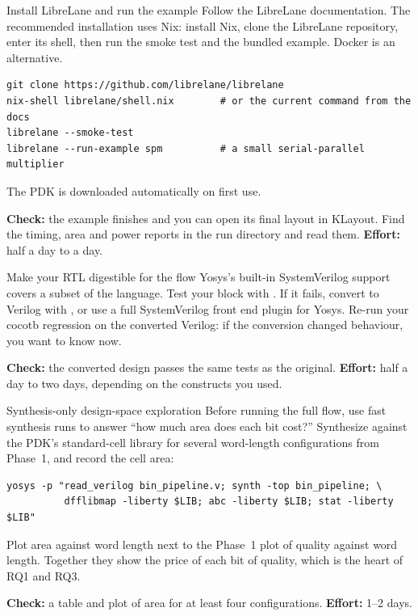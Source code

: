 \begin{stepbox}[label=st:asic:install]{Install LibreLane and run the example}
Follow the LibreLane documentation. The recommended installation uses Nix:
install Nix, clone the LibreLane repository, enter its shell, then run the
smoke test and the bundled example. Docker is an alternative.
\begin{lstlisting}[style=shell]
git clone https://github.com/librelane/librelane
nix-shell librelane/shell.nix        # or the current command from the docs
librelane --smoke-test
librelane --run-example spm          # a small serial-parallel multiplier
\end{lstlisting}
The PDK is downloaded automatically on first use.

\textbf{Check:} the example finishes and you can open its final layout in
KLayout. Find the timing, area and power reports in the run directory and read
them. \textbf{Effort:} half a day to a day.
\end{stepbox}

\begin{stepbox}[label=st:asic:sv]{Make your RTL digestible for the flow}
Yosys's built-in SystemVerilog support covers a subset of the language. Test your
block with . If it
fails, convert to Verilog with , or use a full SystemVerilog front end
plugin for Yosys. Re-run your cocotb regression on the converted Verilog: if
the conversion changed behaviour, you want to know now.

\textbf{Check:} the converted design passes the same tests as the original.
\textbf{Effort:} half a day to two days, depending on the constructs you used.
\end{stepbox}

\begin{stepbox}[label=st:asic:sweep]{Synthesis-only design-space exploration}
Before running the full flow, use fast synthesis runs to answer \enquote{how
much area does each bit cost?} Synthesize  against the
PDK's standard-cell library for several word-length configurations from
Phase~1, and record the cell area:
\begin{lstlisting}[style=shell]
yosys -p "read_verilog bin_pipeline.v; synth -top bin_pipeline; \
          dfflibmap -liberty $LIB; abc -liberty $LIB; stat -liberty $LIB"
\end{lstlisting}
Plot area against word length next to the Phase~1 plot of quality against word
length. Together they show the price of each bit of quality, which is the
heart of RQ1 and RQ3.

\textbf{Check:} a table and plot of area for at least four configurations.
\textbf{Effort:} 1--2 days.
\end{stepbox}

